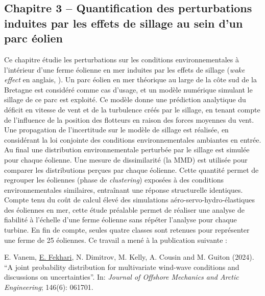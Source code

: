 \subsection*{Chapitre 3 -- Quantification des perturbations induites par les effets de sillage au sein d'un parc \'{e}olien}

Ce chapitre \'{e}tudie les perturbations sur les conditions environnementales à l'int\'{e}rieur d'une ferme \'{e}olienne en mer induites par les effets de sillage (\textit{wake effect} en anglais, \citealp{larsen_2008_wake}). 
Un parc \'{e}olien en mer th\'{e}orique au large de la côte sud de la Bretagne est consid\'{e}r\'{e} comme cas d'usage, et un modèle num\'{e}rique simulant le sillage de ce parc est exploit\'{e}. 
Ce modèle donne une pr\'{e}diction analytique du d\'{e}ficit en vitesse de vent et de la turbulence cr\'{e}\'{e}s par le sillage, en tenant compte de l'influence de la position des flotteurs en raison des forces moyennes du vent. 
Une propagation de l'incertitude sur le modèle de sillage est r\'{e}alis\'{e}e, en consid\'{e}rant la loi conjointe des conditions environnementales ambiantes en entr\'{e}e. 
Au final une distribution environnementale perturb\'{e}e par le sillage est simul\'{e}e pour chaque \'{e}olienne. 
Une mesure de dissimilarit\'{e} (la MMD) est utilis\'{e}e pour comparer les distributions perçues par chaque \'{e}olienne. 
Cette quantit\'{e} permet de regrouper les \'{e}oliennes (phase de \textit{clustering}) expos\'{e}es à des conditions environnementales similaires, entraînant une r\'{e}ponse structurelle identiques. 
Compte tenu du coût de calcul \'{e}lev\'{e} des simulations a\'{e}ro-servo-hydro-\'{e}lastiques des \'{e}oliennes en mer, cette \'{e}tude pr\'{e}alable permet de r\'{e}aliser une analyse de fiabilit\'{e} à l'\'{e}chelle d'une ferme \'{e}olienne sans r\'{e}p\'{e}ter l'analyse pour chaque turbine. 
En fin de compte, seules quatre classes sont retenues pour repr\'{e}senter une ferme de 25 \'{e}oliennes. 
Ce travail a men\'{e} à la publication suivante : 

\medskip
\noindent
{} E. Vanem, \underline{E. Fekhari}, N. Dimitrov, M. Kelly, A. Cousin and M. Guiton (2024). ``A joint probability distribution for multivariate wind-wave conditions and discussions on uncertainties''. In: \textit{Journal of Offshore Mechanics and Arctic Engineering}; 146(6): 061701.



